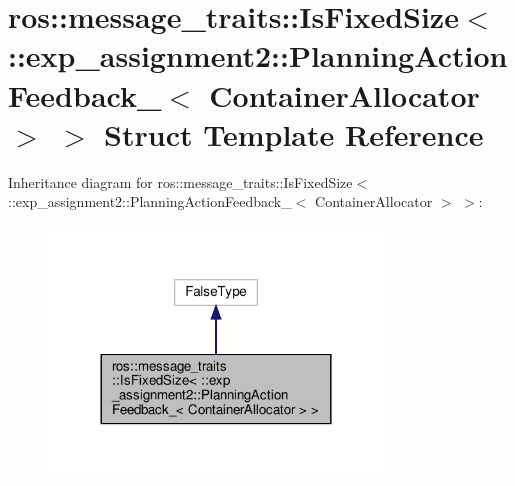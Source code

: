 \hypertarget{structros_1_1message__traits_1_1IsFixedSize_3_01_1_1exp__assignment2_1_1PlanningActionFeedback__13ef0910b8ea3349aff0a96792fec60e}{}\section{ros\+:\+:message\+\_\+traits\+:\+:Is\+Fixed\+Size$<$ \+:\+:exp\+\_\+assignment2\+:\+:Planning\+Action\+Feedback\+\_\+$<$ Container\+Allocator $>$ $>$ Struct Template Reference}
\label{structros_1_1message__traits_1_1IsFixedSize_3_01_1_1exp__assignment2_1_1PlanningActionFeedback__13ef0910b8ea3349aff0a96792fec60e}


Inheritance diagram for ros\+:\+:message\+\_\+traits\+:\+:Is\+Fixed\+Size$<$ \+:\+:exp\+\_\+assignment2\+:\+:Planning\+Action\+Feedback\+\_\+$<$ Container\+Allocator $>$ $>$\+:
\nopagebreak
\begin{figure}[H]
\begin{center}
\leavevmode
\includegraphics[width=252pt]{structros_1_1message__traits_1_1IsFixedSize_3_01_1_1exp__assignment2_1_1PlanningActionFeedback__6a7de6dbf1a437e0e40298efa58dd0e9}
\end{center}
\end{figure}


